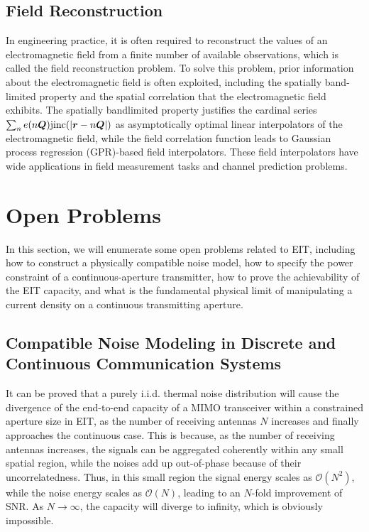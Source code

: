 \documentclass[journal,twocolumn]{IEEEtran}
\begin{document}

\subsection{Field Reconstruction}
In engineering practice, it is often required to reconstruct the values of an electromagnetic field from a finite number of available observations, which is called the field reconstruction problem. 
To solve this problem, prior information about the electromagnetic field is often exploited, including the spatially band-limited property and the spatial correlation that the electromagnetic field exhibits. 
The spatially bandlimited property justifies the cardinal series $\sum_n e(n{\bm Q}) {\rm jinc}(|{\bm r}-n{\bm Q}|)$ as asymptotically optimal linear interpolators \cite{pizzo2022nyquist} of the electromagnetic field, while the field correlation function leads to Gaussian process regression (GPR)-based field interpolators. 
These field interpolators have wide applications in field measurement tasks and channel prediction problems. 

\section{Open Problems}
In this section, we will enumerate some open problems related to EIT, including how to construct a physically compatible noise model, how to specify the power constraint of a continuous-aperture transmitter, how to prove the achievability of the EIT capacity, and what is the fundamental physical limit of manipulating a current density on a continuous transmitting aperture. 

\subsection{Compatible Noise Modeling in Discrete and Continuous Communication Systems}
It can be proved that a purely i.i.d. thermal noise distribution will cause the divergence of the end-to-end capacity of a MIMO transceiver within a constrained aperture size in EIT, as the number of receiving antennas $N$ increases and finally approaches the continuous case. 
This is because, as the number of receiving antennas increases, the signals can be aggregated coherently within any small spatial region, while the noises add up out-of-phase because of their uncorrelatedness. 
Thus, in this small region the signal energy scales as $\mathcal{O}(N^2)$, while the noise energy scales as $\mathcal{O}(N)$, leading to an $N$-fold improvement of SNR. As $N\to\infty$, the capacity will diverge to infinity, which is obviously impossible.  
\end{document}
